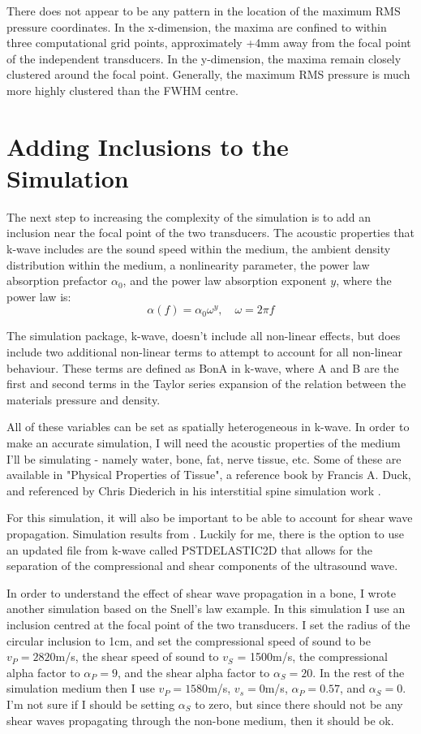 \documentclass[10pt,a4paper]{article}
\begin{document}
There does not appear to be any pattern in the location of the maximum RMS pressure coordinates. In the x-dimension, the maxima are confined to within three computational grid points, approximately +4mm away from the focal point of the independent transducers. In the y-dimension, the maxima remain closely clustered around the focal point. Generally, the maximum RMS pressure is much more highly clustered than the FWHM centre.

\section{Adding Inclusions to the Simulation}

The next step to increasing the complexity of the simulation is to add an inclusion near the focal point of the two transducers. The acoustic properties that k-wave includes are the sound speed within the medium, the ambient density distribution within the medium, a nonlinearity parameter, the power law absorption prefactor $\alpha_0$, and the power law absorption exponent $y$, where the power law is:
\begin{equation}
\alpha(f) = \alpha_0 \omega^y, 	\quad \omega = 2 \pi f 
\end{equation}

The simulation package, k-wave, doesn't include all non-linear effects, but does include two additional non-linear terms to attempt to account for all non-linear behaviour. These terms are defined as BonA in k-wave, where A and B are the first and second terms in the Taylor series expansion of the relation between the materials pressure and density.

All of these variables can be set as spatially heterogeneous in k-wave. In order to make an accurate simulation, I will need the acoustic properties of the medium I'll be simulating - namely water, bone, fat, nerve tissue, etc. Some of these are available in "Physical Properties of Tissue", a reference book by Francis A. Duck, and referenced by Chris Diederich in his interstitial spine simulation work \cite{duck1990physical}.

For this simulation, it will also be important to be able to account for shear wave propagation. Simulation results from \cite{treeby2015contribution}. Luckily for me, there is the option to use an updated file from k-wave called PSTDELASTIC2D that allows for the separation of the compressional and shear components of the ultrasound wave. 

In order to understand the effect of shear wave propagation in a bone, I wrote another simulation based on the Snell's law example. In this simulation I use an inclusion centred at the focal point of the two transducers. I set the radius of the circular inclusion to 1cm, and set the compressional speed of sound to be $v_P = 2820$m/s, the shear speed of sound to $v_S$ = 1500m/s, the compressional alpha factor to $\alpha_P = 9$, and the shear alpha factor to $\alpha_S = 20$. In the rest of the simulation medium then I use $v_P = 1580$m/s, $v_s = 0$m/s, $\alpha_P = 0.57$, and $\alpha_S = 0$. I'm not sure if I should be setting $\alpha_S$ to zero, but since there should not be any shear waves propagating through the non-bone medium, then it should be ok.


\newpage
{}

\end{document}
